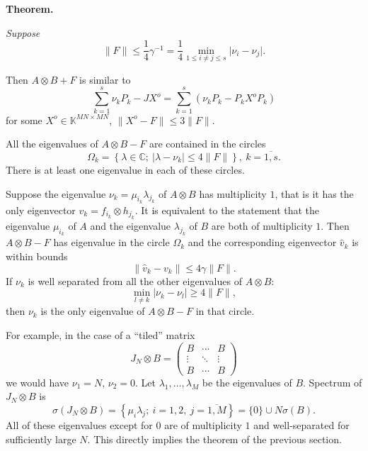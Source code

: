 \documentclass[a4paper]{jpconf}
\begin{document}
\begin{center}
\textbf{Theorem.}
{\it
    Suppose
    \[
        \|F\| \leq \frac14 \gamma^{-1} = \frac14 \min_{1\leq i{\neq}j\leq s}\lvert\nu_i - \nu_j\rvert.
    \]

    Then \( A{\otimes}B + F \) is similar to
    \[ \sum_{k=1}^s \nu_k P_k - JX^o = \sum_{k=1}^s (\nu_k P_k - P_k X^o P_k) \]
    for some \( X^o \in \mathbb{K}^{MN{\times}MN} \),
    \( \|X^o - F\|\leq 3\|F\| \).

    All the eigenvalues of \( A{\otimes}B - F \) are contained in the circles
    \[
        \Omega_k = \left\{
            \lambda\in\mathbb{C};
            \ \lvert\lambda - \nu_k\rvert \leq 4\|F\|
            \right\},
        \ k{=}\overline{1,s}.
    \]
    There is at least one eigenvalue in each of these circles.

    Suppose the eigenvalue \( \nu_k=\mu_{i_k}\lambda_{j_k} \) of \( A{\otimes}B \) has multiplicity \( 1 \),
        that is it has the only eigenvector \( v_k = f_{i_k}{\otimes}h_{j_k} \).
    It is equivalent to the statement that the eigenvalue \( \mu_{i_k} \)
        of \( A \) and the eigenvalue \( \lambda_{j_k} \) of \( B \)
        are both of multiplicity \( 1 \).
    Then \( A{\otimes}B - F \) has eigenvalue in the circle \( \Omega_k \)
        and the corresponding eigenvector \( \hat{v}_k \) is within bounds
    \[
        \|\hat{v}_k - v_k\| \leq 4\gamma \|F\|.
    \]
    If \( \nu_k \) is well separated from all the other eigenvalues of \( A{\otimes}B \):
    \[
        \min_{l\neq k}
        \lvert
        \nu_k - \nu_l
        \rvert
        \geq 4\|F\|,
    \]
    then \( \nu_k \) is the only eigenvalue of \( A{\otimes}B - F \)
    in that circle.
\/}
\end{center}

For example, in the case of a ``tiled'' matrix
\[
    J_N{\otimes}B =
    \begin{pmatrix}
        B & \cdots & B \\
        \vdots & \ddots & \vdots \\
        B & \cdots & B
    \end{pmatrix}
\]
    we would have
    \( \nu_1=N \),
    \( \nu_2=0 \).
Let \( \lambda_1,\ldots,\lambda_M \)
    be the eigenvalues of \( B \).
Spectrum of \( J_N{\otimes}B \) is
    \[
        \sigma(J_N{\otimes}B) = \left\{ \mu_i\lambda_j;\ i{=}1,2,\ j{=}\overline{1,M}\right\} = \{0\}\cup N\sigma(B).
    \]
All of these eigenvalues except for \( 0 \)
    are of multiplicity \( 1 \)
    and well-separated for sufficiently large \( N \).
This directly implies the theorem of the previous section.
    
\end{document}
